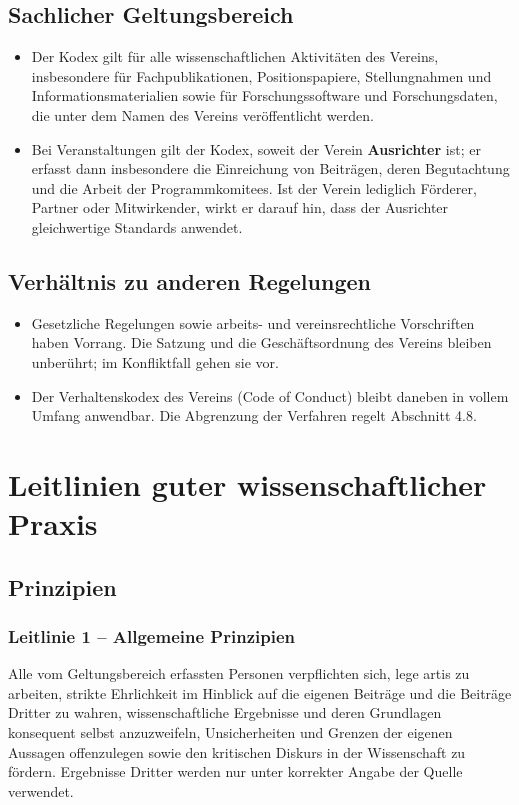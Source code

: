 \documentclass[a4paper, fontsize=11pt]{scrartcl}
\begin{document}
\subsection{Sachlicher Geltungsbereich}
\begin{itemize}
  \item Der Kodex gilt für alle wissenschaftlichen Aktivitäten des Vereins, insbesondere für Fachpublikationen, Positionspapiere, Stellungnahmen und Informationsmaterialien sowie für Forschungssoftware und Forschungsdaten, die unter dem Namen des Vereins veröffentlicht werden.
  \item Bei Veranstaltungen gilt der Kodex, soweit der Verein \textbf{Ausrichter} ist; er erfasst dann insbesondere die Einreichung von Beiträgen, deren Begutachtung und die Arbeit der Programmkomitees. Ist der Verein lediglich Förderer, Partner oder Mitwirkender, wirkt er darauf hin, dass der Ausrichter gleichwertige Standards anwendet.
\end{itemize}

\subsection{Verhältnis zu anderen Regelungen}
\begin{itemize}
  \item Gesetzliche Regelungen sowie arbeits- und vereinsrechtliche Vorschriften haben Vorrang. Die Satzung und die Geschäftsordnung des Vereins bleiben unberührt; im Konfliktfall gehen sie vor.
  \item Der Verhaltenskodex des Vereins (Code of Conduct) bleibt daneben in vollem Umfang anwendbar. Die Abgrenzung der Verfahren regelt Abschnitt 4.8.
\end{itemize}

\section{Leitlinien guter wissenschaftlicher Praxis}

\subsection{Prinzipien}

\subsubsection*{Leitlinie 1 -- Allgemeine Prinzipien}
Alle vom Geltungsbereich erfassten Personen verpflichten sich, lege artis zu arbeiten, strikte Ehrlichkeit im Hinblick auf die eigenen Beiträge und die Beiträge Dritter zu wahren, wissenschaftliche Ergebnisse und deren Grundlagen konsequent selbst anzuzweifeln, Unsicherheiten und Grenzen der eigenen Aussagen offenzulegen sowie den kritischen Diskurs in der Wissenschaft zu fördern. Ergebnisse Dritter werden nur unter korrekter Angabe der Quelle verwendet.
\end{document}
